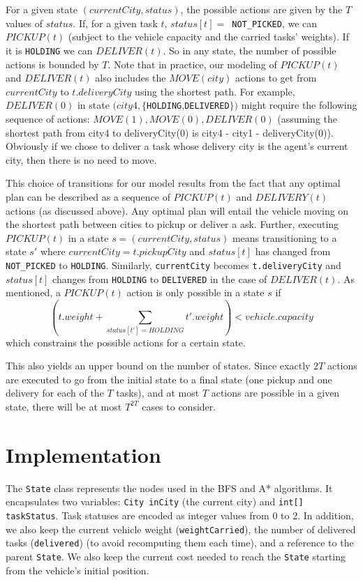 \documentclass[11pt]{article}
\begin{document}
For a given state $(currentCity, status)$, the possible actions are given by the
$T$ values of $status$. If, for a given task $t$, $status[t]=$\verb| NOT_PICKED|,
we can $PICKUP(t)$ (subject to the vehicle capacity and the carried tasks'
weights). If it is \verb|HOLDING| we can $DELIVER(t)$. So in any state, the
number of possible actions is bounded by $T$. Note that in practice, our modeling
of $PICKUP(t)$ and $DELIVER(t)$ also includes the $MOVE(city)$ actions to get
from $currentCity$ to $t.deliveryCity$ using the shortest path. For
example, $DELIVER(0)$ in state $(city4,\{$\verb|HOLDING|,\verb|DELIVERED|$\})$
might require the following sequence of actions: $MOVE(1), MOVE(0), DELIVER(0)$
(assuming the shortest path from city4 to deliveryCity(0) is city4 - city1 -
deliveryCity(0)). Obviously if we chose to deliver a task whose delivery city is
the agent's current city, then there is no need to move.

This choice of transitions for our model results from the fact that any optimal
plan can be described as a sequence of $PICKUP(t)$ and $DELIVERY(t)$ actions (as
discussed above). Any optimal plan will entail the vehicle moving on the
shortest path between cities to pickup or deliver a ask. Further, executing
$PICKUP(t)$ in a state $s=(currentCity, status)$ means transitioning to a state
$s'$ where $currentCity=t.pickupCity$ and $status[t]$ has changed from
\verb|NOT_PICKED| to \verb|HOLDING|. Similarly, \verb|currentCity| becomes \verb|t.deliveryCity|
and $status[t]$ changes from \verb|HOLDING| to \verb|DELIVERED| in the case of
$DELIVER(t)$. As mentioned, a $PICKUP(t)$ action is only possible in a state $s$
if
\[
(t.weight + \sum_{status[t'] = HOLDING} t'.weight) < vehicle.capacity
\]
which constrains the possible actions for a certain state.

This also yields an upper bound on the number of states. Since exactly $2T$
actions are executed to go from the initial state to a final state (one pickup
and one delivery for each of the $T$ tasks), and at most $T$ actions are
possible in a given state, there will be at most $T^{2T}$ cases to consider.


\section{Implementation}

The \verb|State| class represents the nodes used in the BFS and A* algorithms.
It encapsulates two variables: \verb|City inCity| (the current city) and
\verb|int[] taskStatus|. Task statuses are encoded as integer values from 0 to
2. In addition, we also keep the current vehicle weight (\verb|weightCarried|),
the number of delivered tasks (\verb|delivered|) (to avoid recomputing them
each time), and a reference to the parent \verb|State|. We also keep the
current cost needed to reach the \verb|State| starting from the vehicle's
initial position.
\end{document}
